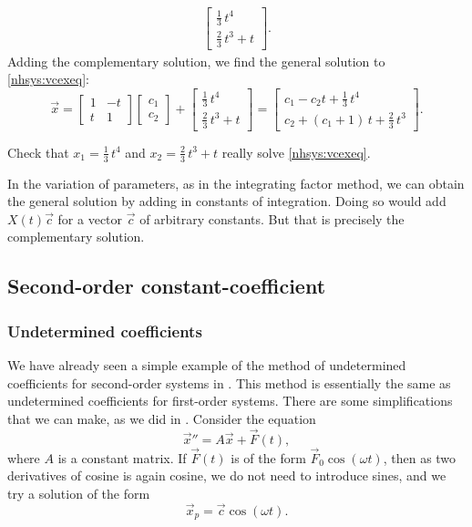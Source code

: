\begin{example}
\begin{equation*}
\begin{split}
\begin{bmatrix}
\frac{1}{3}\,t^4 \\
\frac{2}{3}\,t^3 + t
\end{bmatrix}  .
\end{split}
\end{equation*}
Adding the complementary solution, we find the general solution
to \eqref{nhsys:vcexeq}:
\begin{equation*}
\vec{x} =
\begin{bmatrix}
1 & -t \\
t & 1
\end{bmatrix}
\begin{bmatrix}
c_1 \\ c_2
\end{bmatrix}
+
\begin{bmatrix}
\frac{1}{3}\,t^4 \\
\frac{2}{3}\,t^3 + t
\end{bmatrix}
=
\begin{bmatrix}
c_1 - c_2 t
+
\frac{1}{3}\,t^4 \\
c_2 + 
(c_1 + 1)\, t
+
\frac{2}{3}\,t^3
\end{bmatrix} .
\end{equation*}
\end{example}

\begin{exercise}
Check that $x_1 = 
\frac{1}{3}\,t^4$ and $x_2 = 
\frac{2}{3}\,t^3 + t$ really solve
\eqref{nhsys:vcexeq}.
\end{exercise}

In the variation of parameters, as in the integrating factor method,
we can obtain the general solution by adding in constants of integration.
Doing so would add $X(t) \vec{c}$ for a vector $\vec{c}$ of arbitrary constants.  But
that is precisely the complementary solution.

\subsection{Second-order constant-coefficient}

\subsubsection{Undetermined coefficients}

We have already seen a simple example of the method
of undetermined
coefficients
for second-order systems in .
This method is essentially the same as undetermined coefficients
for first-order systems.
There are some simplifications that we can make, as we did in 
.  Consider the equation
\begin{equation*}
{\vec{x}}'' = A \vec{x} + \vec{F}(t) ,
\end{equation*}
where $A$ is a constant matrix.  If $\vec{F}(t)$ is of the form
$\vec{F}_0 \cos (\omega t)$, then as two derivatives of cosine is again
cosine,
we do not need to introduce sines, and
we try a solution of the form
\begin{equation*}
\vec{x}_p = \vec{c} \cos (\omega t) .
\end{equation*}

